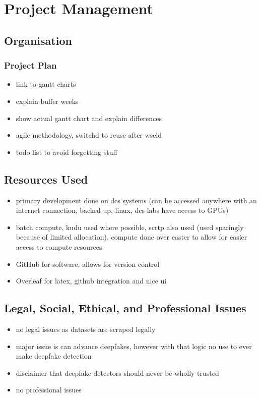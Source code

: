 \chapter{Project Management}
\label{ch:projman}

\section{Organisation}

\subsection{Project Plan}

\begin{itemize}
    \item link to gantt charts
    \item explain buffer weeks
    \item show actual gantt chart and explain differences
    \item agile methodology, switchd to reuse after wseld
    \item todo list to avoid forgetting stuff
\end{itemize}

\section{Resources Used}

\begin{itemize}
    \item primary development done on dcs systems (can be accessed anywhere with an internet connection, backed up, linux, dcs labs have access to GPUs)
    \item batch compute, kudu used where possible, scrtp also used (used sparingly because of limited allocation), compute done over easter to allow for easier access to compute resources
    \item GitHub for software, allows for version control
    \item Overleaf for latex, github integration and nice ui
\end{itemize}

\section{Legal, Social, Ethical, and Professional Issues}

\begin{itemize}
    \item no legal issues as datasets are scraped legally
    \item major issue is can advance deepfakes, however with that logic no use to ever make deepfake detection
    \item disclaimer that deepfake detectors should never be wholly trusted
    \item no professional issues
\end{itemize}